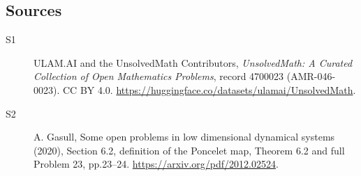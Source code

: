 \documentclass[11pt]{article}
\begin{document}
\subsection{Sources}
\begin{description}
\item[\hypertarget{source:4700023:1}{S1}] ULAM.AI and the UnsolvedMath Contributors, \emph{UnsolvedMath: A Curated Collection of Open Mathematics Problems}, record 4700023 (AMR-046-0023). CC BY 4.0. \url{https://huggingface.co/datasets/ulamai/UnsolvedMath}.
\item[\hypertarget{source:4700023:2}{S2}] A. Gasull, Some open problems in low dimensional dynamical systems (2020), Section 6.2, definition of the Poncelet map, Theorem 6.2 and full Problem 23, pp.23--24. \url{https://arxiv.org/pdf/2012.02524}.
\end{description}
\label{end:4700023}
\end{document}
